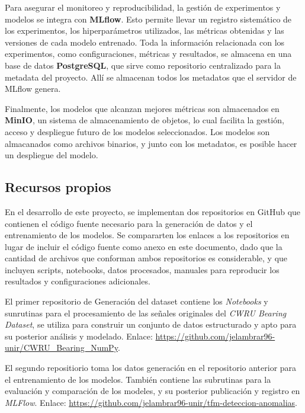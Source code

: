 \documentclass[11pt,a4paper,spanish]{book}
\numberwithin{equation}{chapter}
\numberwithin{figure}{chapter}
\begin{document}
Para asegurar el monitoreo y reproducibilidad, la gestión de experimentos y modelos se 
integra con \textbf{MLflow}. Esto permite llevar un registro 
sistemático de los experimentos, los hiperparámetros utilizados, las métricas obtenidas 
y las versiones de cada modelo entrenado. Toda la información relacionada con los 
experimentos, como configuraciones, métricas y resultados, se almacena en una base de 
datos \textbf{PostgreSQL}, que sirve como repositorio centralizado para la metadata del 
proyecto. Allí se almacenan todos los metadatos que el servidor de MLflow genera. 


Finalmente, los modelos que alcanzan mejores métricas son almacenados en \textbf{MinIO},
un sistema de almacenamiento de objetos, lo cual facilita la gestión, acceso y despliegue 
futuro de los modelos seleccionados. Los modelos son almacanados como archivos binarios, y
junto con los metadatos, es posible hacer un despliegue del modelo. 


\subsection{Recursos propios}


En el desarrollo de este proyecto, se implementan dos repositorios en GitHub que 
contienen el código fuente necesario para la generación de datos y el entrenamiento de 
los modelos. 
Se compararten los enlaces a los repositorios en lugar de incluir el código fuente como 
anexo en este documento, dado que la cantidad de archivos que conforman ambos repositorios
es considerable, y que incluyen scripts, notebooks, datos procesados, manuales para 
reproducir los resultados y configuraciones adicionales.


El primer repositorio de Generación del dataset contiene los 
\textit{Notebooks} y sunrutinas para el 
procesamiento de las señales originales del \textit{CWRU Bearing Dataset}, 
se utiliza para construir un conjunto de datos estructurado y apto para su posterior 
análisis y modelado. Enlace: 
\href{https://github.com/jelambrar96-unir/CWRU_Bearing_NumPy}
{https://github.com/jelambrar96-unir/CWRU\_Bearing\_NumPy}.


El segundo repositiorio toma los datos generación en el repositorio anterior para el entrenamiento
de los modelos. También contiene las subrutinas para la evaluación y comparación de los modeles, 
y su posterior publicación y registro en \textit{MLFlow}. Enlace:
\href{https://github.com/jelambrar96-unir/tfm-deteccion-anomalias}
{https://github.com/jelambrar96-unir/tfm-deteccion-anomalias}.
\end{document}
